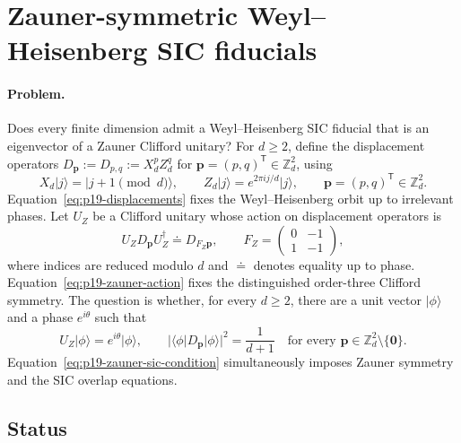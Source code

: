\section{Zauner-symmetric Weyl--Heisenberg SIC fiducials}
\label{sec:problem-19}

\paragraph{Problem.}
Does every finite dimension admit a Weyl--Heisenberg SIC fiducial that is an
eigenvector of a Zauner Clifford unitary?  For $d\geq2$, define the displacement
operators $D_{\mathbf p}:=D_{p,q}:=X_d^pZ_d^q$ for
$\mathbf p=(p,q)^{\mathsf T}\in\mathbb Z_d^2$, using
\begin{equation}
  X_d\lvert j\rangle=\lvert j+1\!\!\pmod d\rangle,
  \qquad
  Z_d\lvert j\rangle=e^{2\pi i j/d}\lvert j\rangle,
  \qquad \mathbf p=(p,q)^{\mathsf T}\in\mathbb Z_d^2.
  \label{eq:p19-displacements}
\end{equation}
Equation~\eqref{eq:p19-displacements} fixes the Weyl--Heisenberg orbit up to
irrelevant phases.  Let $U_Z$ be a Clifford unitary whose action on displacement
operators is
\begin{equation}
  U_ZD_{\mathbf p}U_Z^\dagger\doteq D_{F_Z\mathbf p},
  \qquad
  F_Z=
  \begin{pmatrix}
    0&-1\\
    1&-1
  \end{pmatrix},
  \label{eq:p19-zauner-action}
\end{equation}
where indices are reduced modulo $d$ and $\doteq$ denotes equality up to phase.
Equation~\eqref{eq:p19-zauner-action} fixes the distinguished order-three
Clifford symmetry.
The question is whether, for every $d\geq2$, there are a unit vector
$\lvert\phi\rangle$ and a phase $e^{i\theta}$ such that
\begin{equation}
  U_Z\lvert\phi\rangle=e^{i\theta}\lvert\phi\rangle,
  \qquad
  \bigl|\langle\phi\rvert D_{\mathbf p}\lvert\phi\rangle\bigr|^2
  =\frac{1}{d+1}
  \quad\text{for every }\mathbf p\in\mathbb Z_d^2\setminus\{\mathbf0\}.
  \label{eq:p19-zauner-sic-condition}
\end{equation}
Equation~\eqref{eq:p19-zauner-sic-condition} simultaneously imposes Zauner
symmetry and the SIC overlap equations.

\subsection*{Status}

